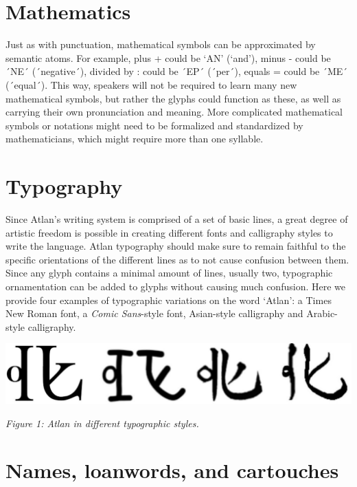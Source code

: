  

\section{Mathematics }

Just as with punctuation, mathematical symbols can be approximated by semantic atoms. For example, plus + could be ‘AN’ \an (‘and’), minus - could be ´NE´ \ne (´negative´), divided by : could be ´EP´ \raisebox{-0.5em}{\ep} (´per´), equals = could be ´ME´ \raisebox{-0.3em}{\me} (´equal´). This way, speakers will not be required to learn many new mathematical symbols, but rather the glyphs could function as these, as well as carrying their own pronunciation and meaning. More complicated mathematical symbols or notations might need to be formalized and standardized by mathematicians, which might require more than one syllable. 




\section{Typography}



\noindent Since Atlan’s writing system is comprised of a set of basic lines, a great degree of artistic freedom is possible in creating different fonts and calligraphy styles to write the language. Atlan typography should make sure to remain faithful to the specific orientations of the different lines as to not cause confusion between them. Since any glyph contains a minimal amount of lines, usually two, typographic ornamentation can be added to glyphs without causing much confusion. Here we provide four examples of typographic variations on the word ‘Atlan’: a Times New Roman font, a {\it Comic Sans}-style font, Asian-style calligraphy and Arabic-style calligraphy.


\begin{center}
\includegraphics[scale=0.15]{./Images/Atlogos.jpeg}

{\footnotesize \it Figure 1: Atlan in different typographic styles.}
\end{center}
\section{Names, loanwords, and cartouches}

